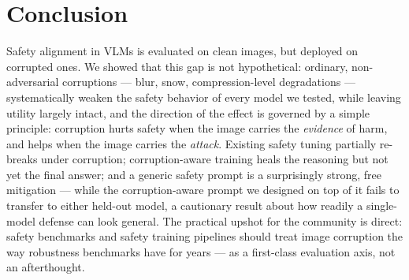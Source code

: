 \section{Conclusion}
\label{sec:conclusion}

Safety alignment in VLMs is evaluated on clean images, but deployed on corrupted ones. We showed that this gap is not hypothetical: ordinary, non-adversarial corruptions --- blur, snow, compression-level degradations --- systematically weaken the safety behavior of every model we tested, while leaving utility largely intact, and the direction of the effect is governed by a simple principle: corruption hurts safety when the image carries the \emph{evidence} of harm, and helps when the image carries the \emph{attack}. Existing safety tuning partially re-breaks under corruption; corruption-aware training heals the reasoning but not yet the final answer; and a generic safety prompt is a surprisingly strong, free mitigation --- while the corruption-aware prompt we designed on top of it fails to transfer to either held-out model, a cautionary result about how readily a single-model defense can look general. The practical upshot for the community is direct: safety benchmarks and safety training pipelines should treat image corruption the way robustness benchmarks have for years --- as a first-class evaluation axis, not an afterthought.
